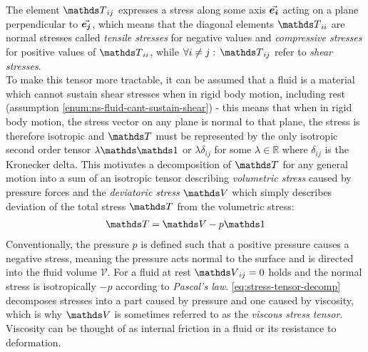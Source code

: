 The element $\mat{T}_{ij}$ expresses a stress along some axis $\vec{\bm{e_i}}$ acting on a plane perpendicular to $\vec{\bm{e_j}}$, which means that the diagonal elements $\mat{T}_{ii}$ are normal stresses called \textit{tensile stresses} for negative values and \textit{compressive stresses} for positive values of $\mat{T}_{ii}$\autocite*{continuum-intro}, while $\forall i\neq j:\,\mat{T}_{ij}$ refer to \textit{shear stresses}\autocite*{anderson}.\\


To make this tensor more tractable, it can be assumed that a fluid is a material which cannot sustain shear stresses when in rigid body motion, including rest\autocite*{continuum-intro} (assumption \ref{enum:ns-fluid-cant-sustain-shear}) - this means that when in rigid body motion, the stress vector on any plane is normal to that plane\autocite*{continuum-intro}, the stress is therefore isotropic and $\mat{T}$ must be represented by the only isotropic second order tensor $\lambda\mat{\mat{1}}$ or $\lambda\delta_{ij}$ for some $\lambda\in\mathds{R}$ where $\delta_{ij}$ is the Kronecker delta\autocite*{course-notes-12800}. This motivates a decomposition of $\mat{T}$ for any general motion into a sum of an isotropic tensor describing \textit{volumetric stress} caused by pressure forces and the \textit{deviatoric stress} $\mat{V}$ which simply describes deviation of the total stress $\mat{T}$ from the volumetric stress\autocite*{derivation-ns-undergrad}:
\begin{align}\label{eq:stress-tensor-decomp}
    \mat{T} = \mat{V} -p\mat{1}
\end{align}
Conventionally, the pressure $p$ is defined such that a positive pressure causes a negative stress, meaning the pressure acts normal to the surface and is directed into the fluid volume $\mathcal{V}$\autocite*{incompressible-flow-volker}. For a fluid at rest $\mat{V}_{ij} = 0$ holds and the normal stress is isotropically $-p$ according to \textit{Pascal's law}\autocite*{course-notes-12800}. \autoref{eq:stress-tensor-decomp} decomposes stresses into a part caused by pressure and one caused by viscosity, which is why $\mat{V}$ is sometimes referred to as the \textit{viscous stress tensor}\autocite*{incompressible-flow-volker}. Viscosity can be thought of as internal friction in a fluid or its resistance to deformation. \\

